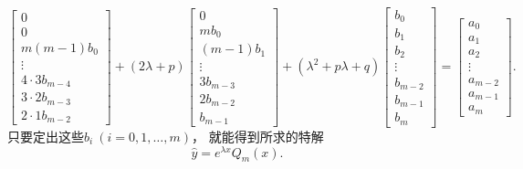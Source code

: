 \begin{enumerate}
\begin{equation*}
\begin{bmatrix}
			0 \\ 0 \\ m(m-1) b_0 \\ \vdots \\
			4\cdot3 b_{m-4} \\ 3\cdot2 b_{m-3} \\ 2\cdot1 b_{m-2}
		\end{bmatrix}
		+ (2\lambda+p)
		\begin{bmatrix}
			0 \\ m b_0 \\ (m-1) b_1 \\ \vdots \\
			3 b_{m-3} \\ 2 b_{m-2} \\ b_{m-1}
		\end{bmatrix}
		+ (\lambda^2+p\lambda+q)
		\begin{bmatrix}
			b_0 \\ b_1 \\ b_2 \\ \vdots \\
			b_{m-2} \\ b_{m-1} \\ b_m
		\end{bmatrix}
		= \begin{bmatrix}
			a_0 \\ a_1 \\ a_2 \\ \vdots \\
			a_{m-2} \\ a_{m-1} \\ a_m
		\end{bmatrix}.
	\end{equation*}
	只要定出这些\(b_i\ (i=0,1,\dotsc,m)\)，
	就能得到所求的特解\begin{equation}
		\hat{y} = e^{\lambda x} Q_m(x).
	\end{equation}


\end{enumerate}
